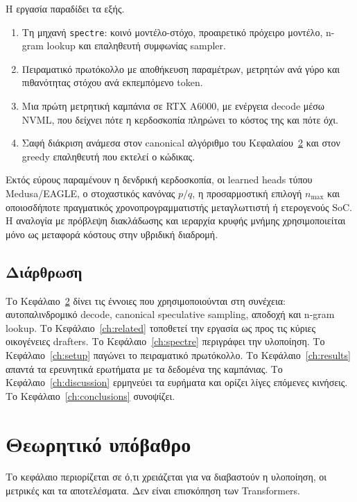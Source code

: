 \documentclass[a4paper,12pt]{report}
\theoremstyle{plain}
\theoremstyle{definition}
\theoremstyle{remark}
\begin{document}
Η εργασία παραδίδει τα εξής.

\begin{enumerate}[leftmargin=*]
  \item
    Τη μηχανή \texttt{spectre}: κοινό μοντέλο-στόχο, προαιρετικό πρόχειρο
    μοντέλο, n-gram lookup και επαληθευτή συμφωνίας sampler.
  \item
    Πειραματικό πρωτόκολλο με αποθήκευση παραμέτρων, μετρητών ανά γύρο και
    πιθανότητας στόχου ανά εκπεμπόμενο token.
  \item
    Μια πρώτη μετρητική καμπάνια σε RTX A6000, με ενέργεια decode μέσω NVML,
    που δείχνει πότε η κερδοσκοπία πληρώνει το κόστος της και πότε όχι.
  \item
    Σαφή διάκριση ανάμεσα στον canonical αλγόριθμο του
    Κεφαλαίου~\ref{ch:background}
    και στον greedy επαληθευτή που εκτελεί ο κώδικας.
\end{enumerate}

Εκτός εύρους παραμένουν η δενδρική κερδοσκοπία, οι learned heads τύπου
Medusa/EAGLE, ο στοχαστικός κανόνας \(p/q\), η προσαρμοστική επιλογή
\(n_{\max}\) και οποιοσδήποτε πραγματικός χρονοπρογραμματιστής μεταγλωττιστή
ή ετερογενούς SoC. Η αναλογία με πρόβλεψη διακλάδωσης και ιεραρχία κρυφής
μνήμης χρησιμοποιείται μόνο ως μεταφορά κόστους στην υβριδική διαδρομή.

\section{Διάρθρωση}

Το Κεφάλαιο~\ref{ch:background} δίνει τις έννοιες που χρησιμοποιούνται στη
συνέχεια: αυτοπαλινδρομικό decode, canonical speculative sampling, αποδοχή
και n-gram lookup. Το Κεφάλαιο~\ref{ch:related} τοποθετεί την εργασία ως προς
τις κύριες οικογένειες drafters. Το Κεφάλαιο~\ref{ch:spectre} περιγράφει την
υλοποίηση. Το Κεφάλαιο~\ref{ch:setup} παγώνει το πειραματικό πρωτόκολλο. Το
Κεφάλαιο~\ref{ch:results} απαντά τα ερευνητικά ερωτήματα με τα δεδομένα της
καμπάνιας. Το Κεφάλαιο~\ref{ch:discussion} ερμηνεύει τα ευρήματα και ορίζει
λίγες επόμενες κινήσεις. Το Κεφάλαιο~\ref{ch:conclusions} συνοψίζει.

\chapter{Θεωρητικό υπόβαθρο}
\label{ch:background}

Το κεφάλαιο περιορίζεται σε ό,τι χρειάζεται για να διαβαστούν η υλοποίηση, οι
μετρικές και τα αποτελέσματα. Δεν είναι επισκόπηση των Transformers.
\end{document}
